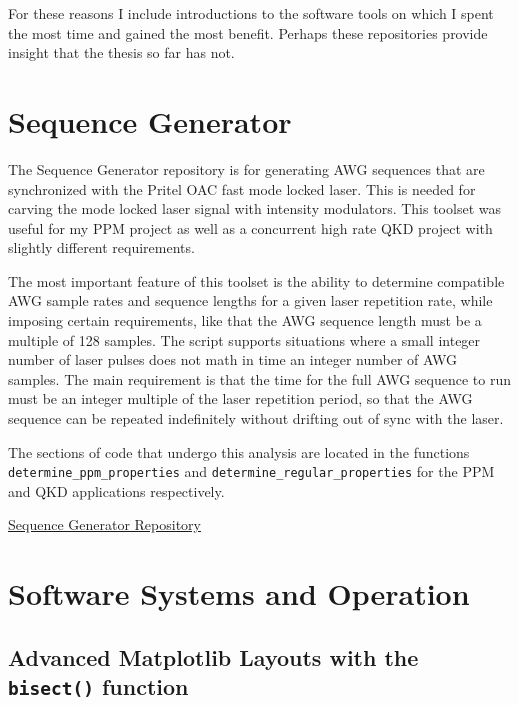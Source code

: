 \documentclass[11pt]{caltech_thesis} %
\begin{document}
For these reasons I include introductions to the software tools on which I spent the most time and gained the most benefit. Perhaps these repositories provide insight that the thesis so far has not.

\hypertarget{sequence-generator}{%
\section{Sequence Generator}\label{sequence-generator}}

The Sequence Generator repository is for generating AWG sequences that are synchronized with the Pritel OAC fast mode locked laser. This is needed for carving the mode locked laser signal with intensity modulators. This toolset was useful for my PPM project as well as a concurrent high rate QKD project with slightly different requirements.

The most important feature of this toolset is the ability to determine compatible AWG sample rates and sequence lengths for a given laser repetition rate, while imposing certain requirements, like that the AWG sequence length must be a multiple of 128 samples. The script supports situations where a small integer number of laser pulses does not math in time an integer number of AWG samples. The main requirement is that the time for the full AWG sequence to run must be an integer multiple of the laser repetition period, so that the AWG sequence can be repeated indefinitely without drifting out of sync with the laser.

The sections of code that undergo this analysis are located in the functions \texttt{determine\_ppm\_properties} and \texttt{determine\_regular\_properties} for the PPM and QKD applications respectively.

\href{https://github.com/sansseriff/sequence_generator/tree/main}{Sequence Generator Repository}

\hypertarget{section}{%
\section{}\label{section}}

\hypertarget{software-systems-and-operation}{%
\section{Software Systems and Operation}\label{software-systems-and-operation}}

\hypertarget{advanced-matplotlib-layouts-with-the-bisect-function}{%
\subsection{\texorpdfstring{Advanced Matplotlib Layouts with the \texttt{bisect()} function}{Advanced Matplotlib Layouts with the bisect() function}}\label{advanced-matplotlib-layouts-with-the-bisect-function}}
\end{document}
